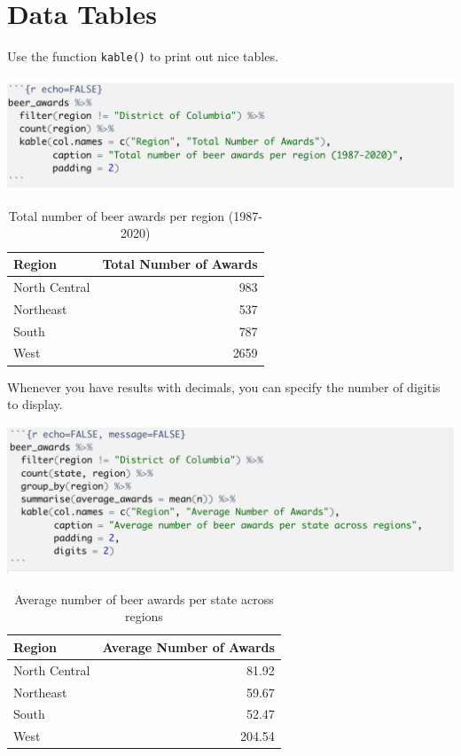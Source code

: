 \documentclass[
]{book}
\begin{document}
\hypertarget{data-tables}{%
\section{Data Tables}\label{data-tables}}

Use the function \texttt{kable()} to print out nice tables.

\includegraphics[width=20.06in]{images/nice_table_01}

\begin{table}

\caption{\label{tab:unnamed-chunk-178}Total number of beer awards per region (1987-2020)}
\centering
\begin{tabular}[t]{l|r}
\hline
Region & Total Number of Awards\\
\hline
North Central & 983\\
\hline
Northeast & 537\\
\hline
South & 787\\
\hline
West & 2659\\
\hline
\end{tabular}
\end{table}

Whenever you have results with decimals, you can specify the number of digitis to display.

\includegraphics[width=20.31in]{images/nice_table_02}

\begin{table}

\caption{\label{tab:unnamed-chunk-180}Average number of beer awards per state across regions}
\centering
\begin{tabular}[t]{l|r}
\hline
Region & Average Number of Awards\\
\hline
North Central & 81.92\\
\hline
Northeast & 59.67\\
\hline
South & 52.47\\
\hline
West & 204.54\\
\hline
\end{tabular}
\end{table}
\end{document}
